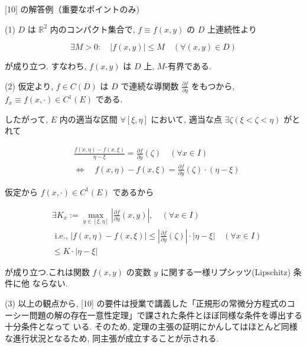 \documentclass[10pt]{article}
\begin{document}
[10] の解答例（重要なポイントのみ)

(1) $D$ は $\mathbb{R}^{2}$ 内のコンパクト集合で, $f \equiv f(x, y)$ の $D$ 上連続性より

$$
\exists M>0: \quad|f(x, y)| \leqslant M \quad(\forall(x, y) \in D)
$$

が成り立つ. すなわち, $f(x, y)$ は $D$ 上, $M$-有界である.

(2) 仮定より, $f \in C(D)$ は $D$ で連続な導関数 $\frac{\partial f}{\partial y}$ をもつから, $f_{x} \equiv f(x, \cdot) \in C^{1}(E)$ である.

したがって, $E$ 内の適当な区間 $\forall[\xi, \eta]$ において, 適当な点 $\exists \zeta(\xi<\zeta<\eta)$ がとれて

$$
\begin{aligned}
& \frac{f(x, \eta)-f(x, \xi)}{\eta-\xi}=\frac{\partial f}{\partial y}(\zeta) \quad(\forall x \in I) \\
& \Longleftrightarrow \quad f(x, \eta)-f(x, \xi)=\frac{\partial f}{\partial y}(\zeta) \cdot(\eta-\xi)
\end{aligned}
$$

仮定から $f(x, \cdot) \in C^{1}(E)$ であるから

$$
\begin{aligned}
& \exists K_{x}:=\max _{y \in[\xi, \eta]}\left|\frac{\partial f}{\partial y}(x, y)\right|, \quad(\forall x \in I) \\
& \text { i.e., }|f(x, \eta)-f(x, \xi)| \leqslant\left|\frac{\partial f}{\partial y}(\zeta)\right| \cdot|\eta-\xi| \quad(\forall x \in I) \\
& \leqslant K \cdot|\eta-\xi|
\end{aligned}
$$

が成り立つ.これは関数 $f(x, y)$ の変数 $y$ に関する一様リプシッツ(Lipschitz) 条件に他 ならない.

(3) 以上の観点から, [10] の要件は授業で講義した「正規形の常微分方程式のコーシー問題の解の存在一意性定理」で課された条件とほぼ同様な条件を導出する十分条件となって いる. そのため, 定理の主張の証明にかんしてはほとんど同様な進行状況となるため, 同主張が成立することが示される.
\end{document}
